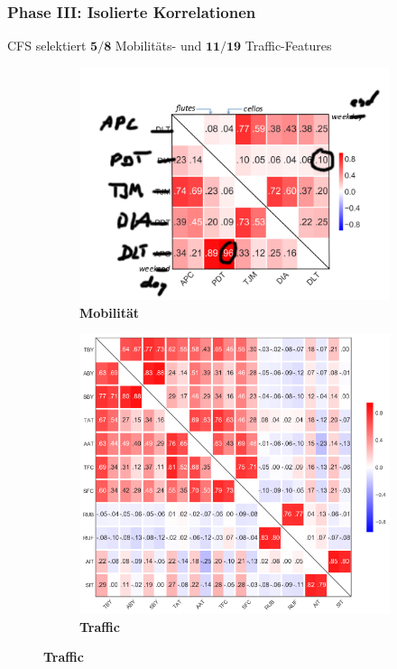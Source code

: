 \documentclass{beamer}
\begin{document}
\begin{frame}
  \frametitle{Phase III: Isolierte Korrelationen}
  CFS selektiert $\boldsymbol{5 / 8}$ Mobilitäts- und $\boldsymbol{11 / 19}$ Traffic-Features

  \begin{figure}[H]
    \centering
    \begin{subfigure}[b]{0.4\textwidth}
      \includegraphics[width=1.2\textwidth]{images/mobility_correlations.png}
      \caption*{\textbf{Mobilität}}
    \end{subfigure}
    \hspace{10px}
    \begin{subfigure}[b]{0.4\textwidth}
      \includegraphics[width=1.2\textwidth]{images/traffic_correlations.png}  
      \caption*{\textbf{Traffic}}
    \end{subfigure}    
  \end{figure}  
\end{frame}
\end{document}
